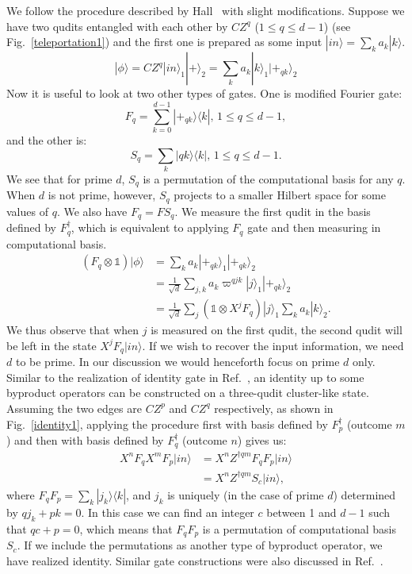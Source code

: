 \documentclass[aps,amsfonts,pra,twocolumn,showpacs]{revtex4-1}
\newcommand{\be}{\begin{equation}}
\newcommand{\ee}{\end{equation}}
\begin{document}
	We follow the procedure described by Hall~\cite{Hall2006} with slight modifications. Suppose we have two qudits entangled with each other by $CZ^q$ ($1\leq q \leq d-1$) (see Fig.~\ref{teleportation1}) and the first one is prepared as some input $|in\rangle = \sum_k a_k |k\rangle$.
		\be
		|\phi\rangle =  CZ^q |in\rangle_1 |+\rangle_2 = \sum_k a_k |k\rangle_1 |+_{qk}\rangle_2
		\ee
	Now it is useful to look at two other types of gates. One is modified Fourier gate:
		\be
		F_q = \sum_{k=0}^{d-1} |+_{qk}\rangle \langle k|, \, 1 \leq q \leq d-1,
		\ee
and the other is:
		\be
		S_q = \sum_k |qk\rangle \langle k|, \,  1 \leq q \leq d-1.
		\ee
	We see that for prime $d$, $S_q$ is a permutation of the computational basis for any $q$. When $d$ is not prime, however, $S_q$ projects to a smaller Hilbert space for some values of $q$. We also have $F_q = F S_q$. We measure the first qudit in the basis defined by $F_q^\dagger$, which is equivalent to applying $F_q$ gate and then measuring in computational basis.
		\begin{align}
		(F_q \otimes \mathds{1}) |\phi\rangle &= \sum_k a_k |+_{qk}\rangle_1 |+_{qk}\rangle_2 \nonumber \\
			&= \frac{1}{\sqrt{d}} \sum_{j, k} a_k \varpi^{qjk} |j\rangle_1 |+_{qk}\rangle_2 \nonumber \\
			&= \frac{1}{\sqrt{d}} \sum_j (\mathds{1} \otimes X^jF_q) |j\rangle_1 \sum_k a_k|k\rangle_2.
		\end{align}
	We thus observe that when $j$ is measured on the first qudit, the second qudit will be left in the state $X^jF_q |in\rangle$. If we wish to recover the input information, we need $d$ to be prime. In our discussion we would henceforth focus on prime $d$ only. Similar to the realization of identity gate in Ref.~\cite{Raussendorf2003}, an identity up to some byproduct operators can be constructed on a three-qudit cluster-like state. Assuming the two edges are $CZ^p$ and $CZ^q$ respectively,  as shown in Fig.~\ref{identity1}, applying the procedure first with basis defined by $F_p^\dagger$ (outcome $m$) and then with basis defined by $F_q^\dagger$ (outcome $n$) gives us:
		\begin{align}
		X^nF_qX^mF_p |in\rangle &= X^n Z^{\dagger qm} F_q F_p |in\rangle \nonumber \\
			&= X^n Z^{\dagger qm} S_c |in\rangle,
		\end{align}
	where $F_qF_p = \sum_k |j_k\rangle \langle k|$, and $j_k$ is uniquely (in the case of prime $d$) determined by $qj_k+pk=0$. In this case we can find an integer $c$ between 1 and $d-1$ such that $qc+p=0$, which means that $F_qF_p$ is a permutation of computational basis $S_c$. If we include the permutations as another type of byproduct operator, we have realized identity. Similar gate constructions were also discussed in Ref.~\cite{Wang2017}.
\end{document}

